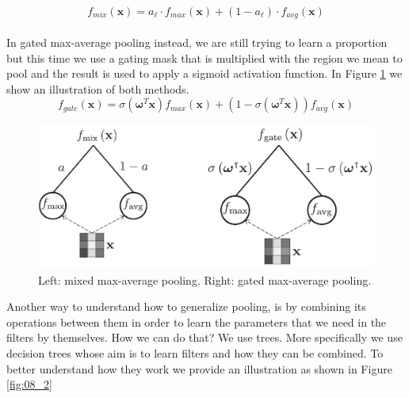 \begin{equation}
    \label{eq:08_1}
    f_{mix}(\textbf{x}) = a_{\ell} \cdot f_{max}(\textbf{x})+(1- a_{\ell}) \cdot f_{avg}(\textbf{x})
\end{equation}\\
In gated max-average pooling instead, we are still trying to learn a proportion but this time we use a gating mask that is multiplied with the region we mean to pool and the result is used to apply a sigmoid activation function. In Figure \ref{fig:08_1} we show an illustration of both methods.\\

\begin{equation}
    \label{eq:08_2}
    f_{gate}(\textbf{x}) = \sigma(\mathbold{\omega}^T\textbf{x})f_{max}(\textbf{x})+(1-\sigma(\mathbold{\omega}^T\textbf{x}))f_{avg}(\textbf{x})
\end{equation}

\begin{figure}[h!]
    \centering
    \includegraphics[scale=0.75]{images/08_1.png}
    \caption{Left: mixed max-average pooling. Right: gated max-average pooling.}
    \label{fig:08_1}
\end{figure}

\FloatBarrier

Another way to understand how to generalize pooling, is by combining its operations between them in order to learn the parameters that we need in the filters by themselves. How we can do that? We use trees. More specifically we use decision trees whose aim is to learn filters and how they can be combined. To better understand how they work we provide an illustration as shown in Figure \ref{fig:08_2}

